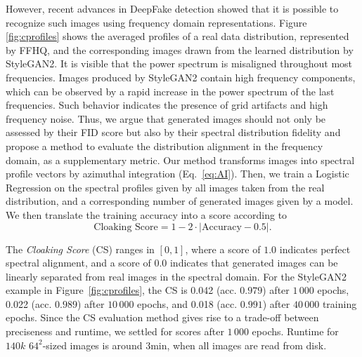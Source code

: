 \documentclass[letterpaper]{article} %
\begin{document}
However, recent advances in DeepFake detection \cite{durall2019unmasking,margret2020upconvolution, frank2020leveraging} showed that it is possible to recognize such images using frequency domain representations.
Figure \ref{fig:cprofiles} shows the averaged profiles of a real data distribution, represented by FFHQ, and the corresponding images drawn from the learned distribution by StyleGAN2.
It is visible that the power spectrum is misaligned throughout most frequencies.
Images produced by StyleGAN2 contain high frequency components, which can be observed by a rapid increase in the power spectrum of the last frequencies. Such behavior indicates the presence of grid artifacts and high frequency noise. 
Thus, 
we argue that generated images should not only be assessed by their FID score but also by their spectral distribution fidelity and propose a method to evaluate the distribution alignment in the frequency domain, as a supplementary metric. %
Our method transforms images into spectral profile vectors by azimuthal integration (Eq.~\eqref{eq:AI}).
Then, we train a Logistic Regression on the spectral profiles given by all images taken from the real distribution, and a corresponding number of generated images given by a model. 
We then translate the training accuracy into a score according to %
\begin{equation}
    \text{Cloaking Score} = 1 - 2 \cdot \lvert \text{Accuracy} - 0.5 \rvert.
    \label{eq:cloaking}
\end{equation}

The \textit{Cloaking Score} (CS) ranges in $[0,1]$, where a score of $1.0$ indicates perfect spectral alignment, and a score of $0.0$ indicates that generated images can be linearly separated from real images in the spectral domain. For the StyleGAN2~\cite{karras2019StyleGAN2} example in Figure~\ref{fig:cprofiles}, the CS is 0.042 (acc. $0.979$) after $1\,000$ epochs, 0.022 (acc. $0.989$) after $10\,000$ epochs, and 0.018 (acc. $0.991$) after $40\,000$ training epochs.
%
%
Since the CS evaluation method gives rise to a trade-off between preciseness and runtime, we settled for scores after $1\,000$ epochs.
Runtime for $140k$ $64^2$-sized images is around $3$min, when all images are read from disk.
\end{document}
